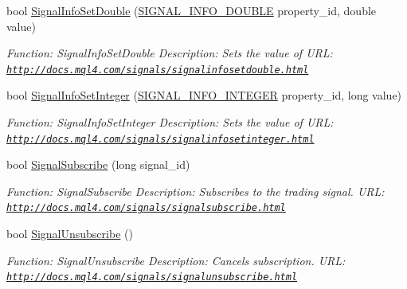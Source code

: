 \begin{DoxyCompactItemize}
bool \hyperlink{class_m_q_l4_c_sharp_1_1_base_1_1_m_q_l_base_a889d73ce31a9bb4686b0bf9c939fa2a5}{Signal\+Info\+Set\+Double} (\hyperlink{namespace_m_q_l4_c_sharp_1_1_base_1_1_enums_a80b17d9a3dd57e02283914b41c3a9f60}{S\+I\+G\+N\+A\+L\+\_\+\+I\+N\+F\+O\+\_\+\+D\+O\+U\+B\+LE} property\+\_\+id, double value)
\begin{DoxyCompactList}\small\item\em Function\+: Signal\+Info\+Set\+Double Description\+: Sets the value of U\+RL\+: \href{http://docs.mql4.com/signals/signalinfosetdouble.html}{\tt http\+://docs.\+mql4.\+com/signals/signalinfosetdouble.\+html} \end{DoxyCompactList}\item 
bool \hyperlink{class_m_q_l4_c_sharp_1_1_base_1_1_m_q_l_base_ad639eb5dbf5acce1d9707ead17a12846}{Signal\+Info\+Set\+Integer} (\hyperlink{namespace_m_q_l4_c_sharp_1_1_base_1_1_enums_ab3373be5a69a03b44356baab2b3afc4d}{S\+I\+G\+N\+A\+L\+\_\+\+I\+N\+F\+O\+\_\+\+I\+N\+T\+E\+G\+ER} property\+\_\+id, long value)
\begin{DoxyCompactList}\small\item\em Function\+: Signal\+Info\+Set\+Integer Description\+: Sets the value of U\+RL\+: \href{http://docs.mql4.com/signals/signalinfosetinteger.html}{\tt http\+://docs.\+mql4.\+com/signals/signalinfosetinteger.\+html} \end{DoxyCompactList}\item 
bool \hyperlink{class_m_q_l4_c_sharp_1_1_base_1_1_m_q_l_base_a3a8ea79446af01cc5ce11bc6f0030bab}{Signal\+Subscribe} (long signal\+\_\+id)
\begin{DoxyCompactList}\small\item\em Function\+: Signal\+Subscribe Description\+: Subscribes to the trading signal. U\+RL\+: \href{http://docs.mql4.com/signals/signalsubscribe.html}{\tt http\+://docs.\+mql4.\+com/signals/signalsubscribe.\+html} \end{DoxyCompactList}\item 
bool \hyperlink{class_m_q_l4_c_sharp_1_1_base_1_1_m_q_l_base_aad0ba6fa00fda76f0df7d432aeb3d21e}{Signal\+Unsubscribe} ()
\begin{DoxyCompactList}\small\item\em Function\+: Signal\+Unsubscribe Description\+: Cancels subscription. U\+RL\+: \href{http://docs.mql4.com/signals/signalunsubscribe.html}{\tt http\+://docs.\+mql4.\+com/signals/signalunsubscribe.\+html} \end{DoxyCompactList}\item 

\end{DoxyCompactItemize}
